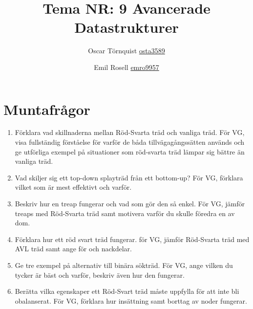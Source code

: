 \documentclass[a5paper,10pt,oneside]{article}
\title{Tema NR: 9 Avancerade Datastrukturer}
\author{Oscar Törnquist \url{osta3589} \and Emil Rosell \url{emro9957}}
\begin{document}
\maketitle

\section*{Muntafrågor}
\begin{enumerate}
\item Förklara vad skillnaderna mellan Röd-Svarta träd och vanliga träd. För VG, visa fullständig förståelse för varför de båda tillvägagångssätten används och ge utförliga exempel på situationer som röd-svarta träd lämpar sig bättre än vanliga träd.
\item Vad skiljer sig ett top-down splayträd från ett bottom-up? För VG, förklara vilket som är mest effektivt och varför.
\item Beskriv hur en treap fungerar och vad som gör den så enkel. För VG, jämför treaps med Röd-Svarta träd samt motivera varför du skulle föredra en av dom.
\item Förklara hur ett röd svart träd fungerar. för VG, jämför Röd-Svarta träd med AVL träd samt ange för och nackdelar.
\item Ge tre exempel på alternativ till binära sökträd. För VG, ange vilken du tycker är bäst och varför, beskriv även hur den fungerar.    
\item Berätta vilka egenskaper ett Röd-Svart träd måste uppfylla för att inte bli obalanserat. För VG, förklara hur insättning samt borttag av noder fungerar.


\end{enumerate}
\end{document}
